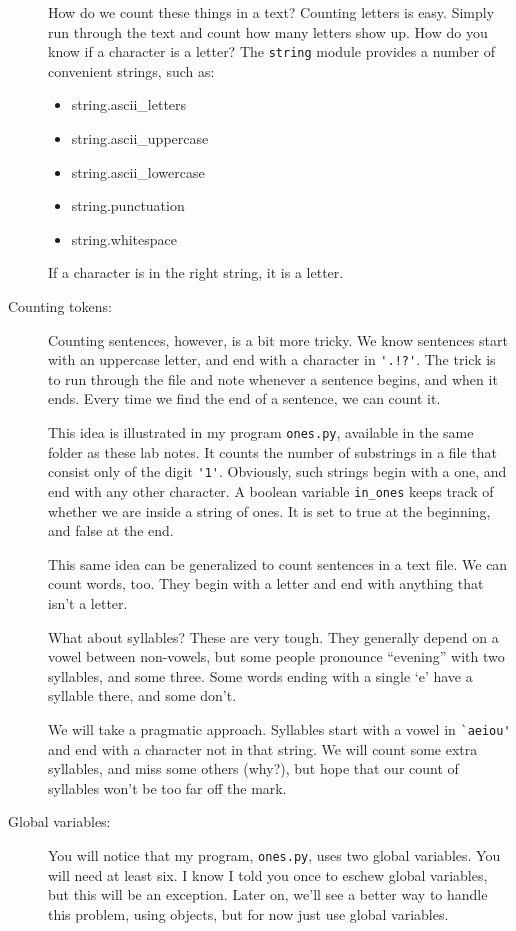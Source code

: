 \documentclass[12pt]{article}
\begin{document}
\begin{description}
How do we count these things in a text?  Counting letters is easy.
Simply run through the text and count how many letters show up.
How do you know if a character is a letter?  The \lstinline{string}
module provides a number of convenient strings, such as:
\begin{itemize}\tt
\item string.ascii\_letters
\item string.ascii\_uppercase
\item string.ascii\_lowercase
\item string.punctuation
\item string.whitespace
\end{itemize}
If a character is in the right string, it is a letter.

\item[Counting tokens:]
Counting sentences, however, is a bit more tricky.
We know sentences start with an uppercase letter,
and end with a character in \lstinline{'.!?'}.
The trick is to run through the file and note 
whenever a sentence begins, and when it ends.
Every time we find the end of a sentence, we can
count it.

This idea is illustrated in my program {\tt ones.py},
available in the same folder as these lab notes.
It counts the number of substrings in a file that
consist only of the digit \lstinline{'1'}.  Obviously,
such strings begin with a one, and end with any other
character.  A boolean variable \lstinline{in_ones}
keeps track of whether we are inside a string of ones.
It is set to true at the beginning, and false at the 
end.

This same idea can be generalized to count sentences
in a text file. We can count words, too.  They  begin
with a letter and end with anything that isn't a letter.

What about syllables?  These are very tough.  They generally
depend on a vowel between non-vowels, but some
people pronounce ``evening'' with two syllables, and some
three.  Some words ending with a single `e' have a sylla{\sc ble}
there, and so{\sc me} don't.

We will take a pragmatic approach.  Syllables start with a vowel
in \lstinline{`aeiou'} and end with a character not in that string.
We will count some extra syllables, and miss some others (why?),
but hope that our count of syllables won't be too far off the mark.

\item[Global variables:] You will notice that my
program, {\tt ones.py}, uses two global variables.
You will need at least six.  I know I told you once to eschew
global variables, but this will be an exception.  Later on,
we'll see a better way to handle this problem, using objects,
but for now just use global variables.


\end{description}
\end{document}
